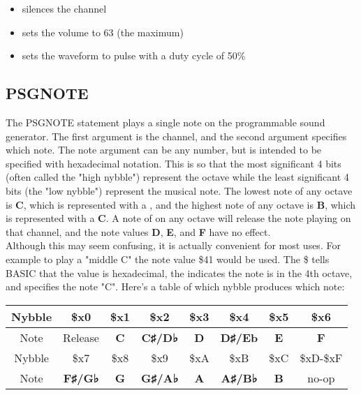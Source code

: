\begin{itemize}

	\item silences the channel

	\item sets the volume to 63 (the maximum)

	\item sets the waveform to pulse with a duty cycle of 50\%

\end{itemize}

\subsection{PSGNOTE}

The {\ttfamily PSGNOTE} statement plays a single note on the programmable sound
generator.  The first argument is the channel, and the second argument
specifies which note.  The note argument can be any number, but is intended to
be specified with hexadecimal notation.  This is so that the most significant 4
bits (often called the "high nybble") represent the octave while the least
significant 4 bits (the "low nybble") represent the musical note.  The lowest
note of any octave is {\ttfamily\bfseries C}, which is represented with a
{}, and the highest note of any octave is {\ttfamily\bfseries B},
which is represented with a {\ttfamily\bfseries C}.  A note of {} on
any octave will release the note playing on that channel, and the note values
{\ttfamily\bfseries D}, {\ttfamily\bfseries E}, and {\ttfamily\bfseries F} have
no effect.\\

Although this may seem confusing, it is actually convenient for most uses.
For example to play a "middle C" the note value {\ttfamily \$41} would be used.
The {\ttfamily \$} tells BASIC that the value is hexadecimal, the {}
indicates the note is in the 4th octave, and {} specifies the note
"C".  Here's a table of which nybble produces which note:\\

\begin{tabular}{|c|c|c|c|c|c|c|c|}
	\hline

	Nybble & \$x0 & \$x1 & \$x2 & \$x3 & \$x4 & \$x5 & \$x6 \\ \hline Note &
	Release & {\ttfamily\bfseries C} & {\ttfamily\bfseries C♯/D♭} &
	{\ttfamily\bfseries D} & {\ttfamily\bfseries D♯/Eb} & {\ttfamily\bfseries
	E} & {\ttfamily\bfseries F} \\ \hline

	Nybble & \$x7 & \$x8 & \$x9 & \$xA & \$xB & \$xC & \$xD-\$xF \\ \hline Note
	& {\ttfamily\bfseries F♯/G♭} & {\ttfamily\bfseries G} & {\ttfamily\bfseries
	G♯/A♭} & {\ttfamily\bfseries A} & {\ttfamily\bfseries A♯/B♭} &
	{\ttfamily\bfseries B} & no-op \\ \hline

\end{tabular}\\

